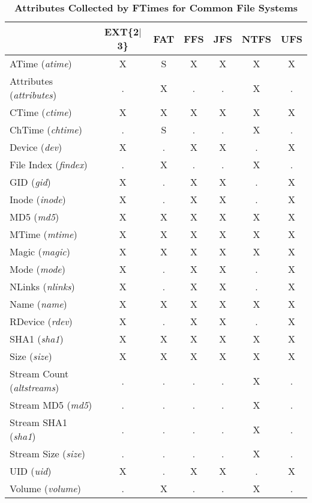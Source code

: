 \documentclass[10pt]{article}
\begin{document}
\begin{table}
\begin{center}
\caption{\bf Attributes Collected by FTimes for Common File Systems\label{tbl:attributes}}

\vspace{.5em}
\begin{tabular}[h]{lcccccc}
 & EXT\{2$\mid$3\} & FAT & FFS & JFS & NTFS & UFS \\\hline
   ATime ({\it atime})             & X &  S &  X &  X &  X &  X \\
   Attributes ({\it attributes})   & . &  X &  . &  . &  X &  . \\
   CTime ({\it ctime})             & X &  X &  X &  X &  X &  X \\
   ChTime ({\it chtime})           & . &  S &  . &  . &  X &  . \\
   Device ({\it dev})              & X &  . &  X &  X &  . &  X \\
   File Index ({\it findex})       & . &  X &  . &  . &  X &  . \\
   GID ({\it gid})                 & X &  . &  X &  X &  . &  X \\
   Inode ({\it inode})             & X &  . &  X &  X &  . &  X \\
   MD5 ({\it md5})                 & X &  X &  X &  X &  X &  X \\
   MTime ({\it mtime})             & X &  X &  X &  X &  X &  X \\
   Magic ({\it magic})             & X &  X &  X &  X &  X &  X \\
   Mode ({\it mode})               & X &  . &  X &  X &  . &  X \\
   NLinks ({\it nlinks})           & X &  . &  X &  X &  . &  X \\
   Name ({\it name})               & X &  X &  X &  X &  X &  X \\
   RDevice ({\it rdev})            & X &  . &  X &  X &  . &  X \\
   SHA1 ({\it sha1})               & X &  X &  X &  X &  X &  X \\
   Size ({\it size})               & X &  X &  X &  X &  X &  X \\
   Stream Count ({\it altstreams}) & . &  . &  . &  . &  X &  . \\
   Stream MD5 ({\it md5})          & . &  . &  . &  . &  X &  . \\
   Stream SHA1 ({\it sha1})        & . &  . &  . &  . &  X &  . \\
   Stream Size ({\it size})        & . &  . &  . &  . &  X &  . \\
   UID ({\it uid})                 & X &  . &  X &  X &  . &  X \\
   Volume ({\it volume})           & . &  X &  . &  . &  X &  . \\
\end{tabular}
\end{center}
\end{table}
\end{document}
